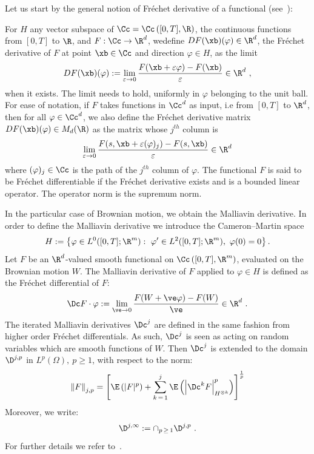 Let us start by the general notion of Fréchet derivative of a functional (see~\cite[p.~128]{kriegl-michor1997}):
\begin{defi}\label{frechet-derivative}
For $H$ any vector subspace of $\Cc= \Cc\left([0,T], \R \right)$, the continuous functions from $[0,T]$ to $\R$, and $F: \Cc \to \R^d$, we\linebreak define $DF(\xb)(\varphi)\in\R^d$, the Fréchet derivative of $F$ at point $\xb \in \Cc$ and direction $\varphi\in H$, as the limit
\begin{equation}
DF(\xb)(\varphi):=\lim_{\varepsilon \to 0 }\frac{F(\xb+\varepsilon \varphi)-F(\xb)}{\varepsilon}\in\R^d \ ,
\end{equation} 
when it exists. The limit needs to hold, uniformly in $\varphi$ belonging to the unit ball. For ease of notation, if $F$ takes functions in $\Cc^d$ as input, i.e from $[0,T]$ to $\R^d$, then for all $\varphi \in \Cc^d$, we also define the Fréchet derivative matrix $DF(\xb)(\varphi) \in M_d(\R)$ as the matrix whose $j^{th}$ column is
\[
\lim_{\varepsilon\to 0 }\frac{F(s,\xb+\varepsilon(\varphi)_j)-F(s,\xb)}{\varepsilon} \in \R^d
\]
where $(\varphi)_j\in \Cc$ is the path of the $j^{th}$ column of $\varphi$. The functional $F$ is said to be Fréchet differentiable if the Fréchet derivative exists and is a bounded linear operator. The operator norm is the supremum norm.
\end{defi}

In the particular case of Brownian motion, we obtain the Malliavin derivative. In order to define the Malliavin derivative we introduce the Cameron--Martin space
\[
H:=\left\{ \varphi \in L^0([0,T]; \R^m): \ \varphi' \in L^2([0,T]; \R^m), \ \varphi(0) = 0 \right\}.
\]
Let $F$ be an $\R^d$-valued smooth functional on $\Cc\left([0,T], \R^m \right)$, evaluated on the Brownian motion $W$. The Malliavin derivative of $F$ applied to $\varphi \in H$ is defined as the Fréchet differential of $F$:
\[
\Dc F \cdot \varphi := \lim_{\ve\to 0}\frac{F(W+\ve \varphi)-F(W)}{\ve} \in \R^d \ .
\]
The iterated Malliavin derivatives $\Dc^j$ are defined in the same fashion from higher order Fréchet differentials. As such, $\Dc^j$ is seen as acting on random variables which are smooth functions of $W$. Then $\Dc^j$ is extended to the domain $\D^{j,p}$ in $L^p(\Omega), \ p \geq 1$, with respect to the norm:
\[
\left\| F \right\|_{j,p} = \left[\E \left(|F|^p\right) + \sum_{k\,=\,1}^j \E\left(\left| \Dc^k F \right|^p_{H^{\otimes k}} \right)\right]^{\frac{1}{p}}
\]
Moreover, we write:
\[
\D^{j, \infty} := \cap_{p\,\geq\,1} \D^{j, p} \ .
\]
For further details we refer to~\cite[Section~1.2]{Nualart2006}.

